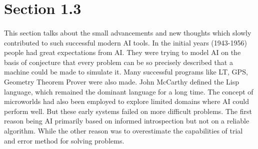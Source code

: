 \documentclass{article}
\begin{document}
















\section{Section 1.3} \cite{aibook}
\paragraph{}
  This section talks about the small advancements and new thoughts which slowly contributed to such successful modern AI tools. 
  In the initial years (1943-1956) people had great expectations from AI. 
  They were trying to model AI on the basis of conjecture that every problem can be so precisely described that a machine could be made to simulate it. 
  Many successful programs like LT, GPS, Geometry Theorem Prover were also made. 
  John McCarthy defined the Lisp language, which remained the dominant language for a long time.
  The concept of microworlds had also been employed to explore limited domains where AI could perform well. 
  But these early systems failed on more difficult problems. The first reason being AI primarily based on informed introspection but not on a reliable algorithm.
  While the other reason was to overestimate the capabilities of trial and error method for solving problems.
\end{document}
